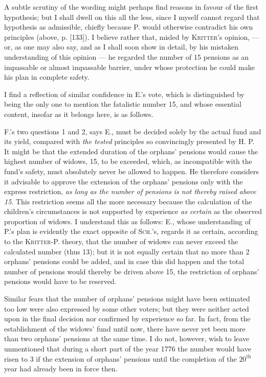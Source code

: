 \par{}
A subtle scrutiny of the wording might perhaps find reasons in favour of the first hypothesis; but I shall dwell on this all the less, since I myself cannot regard that hypothesis as admissible, chiefly because P. would otherwise contradict his own principles (above, p. [133]). I believe rather that, misled by \textsc{Kritter}'s opinion, — or, as one may also say, and as I shall soon show in detail, by his mistaken understanding of this opinion — he regarded the number of 15 pensions as an impassable or almost impassable barrier, under whose protection he could make his plan in complete safety.

I find a reflection of similar confidence in E.'s vote, which is distinguished by being the only one to mention the fatalistic number 15, and whose essential content, insofar as it belongs here, is as follows.

F.'s two questions 1 and 2, says E., must be decided solely by the actual fund and its yield, compared with \textit{the tested} principles so convincingly presented by H. P. It might be that the extended duration of the orphans' pensions would cause the highest number of widows, 15, to be exceeded, which, as incompatible with the fund's safety, must absolutely never be allowed to happen. He therefore considers it advisable to approve the extension of the orphans' pensions only with the express restriction, \textit{as long as the number of pensions is not thereby raised above 15}. This restriction seems all the more necessary because the calculation of the children's circumstances is not supported by experience \textit{as certain} as the observed proportion of widows. I understand this as follows: E., whose understanding of P.'s plan is evidently the exact opposite of \textsc{Sch.}'s, regards it as certain, according to the \textsc{Kritter}-P. theory, that the number of widows can never exceed the calculated number (thus 13); but it is not equally certain that no more than 2 orphans' pensions could be added, and in case this did happen and the total number of pensions would thereby be driven above 15, the restriction of orphans' pensions would have to be reserved.

Similar fears that the number of orphans' pensions might have been estimated too low were also expressed by some other voters; but they were neither acted upon in the final decision nor confirmed by experience so far. In fact, from the establishment of the widows' fund until now, there have never yet been more than two orphans' pensions at the same time. I do not, however, wish to leave unmentioned that during a short part of the year 1776 the number would have risen to 3 if the extension of orphans' pensions until the completion of the \(20^{\text{th}}\) year had already been in force then.

